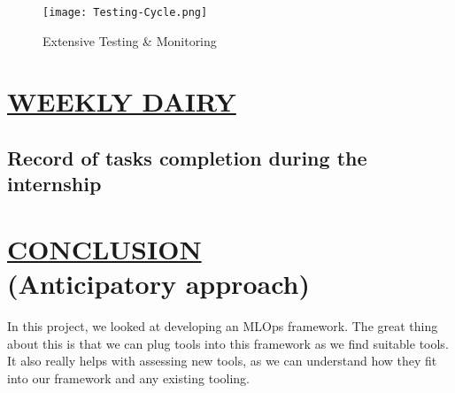 \documentclass[12pt,oneside,a4paper]{report}
\begin{document}
\begin{figure}[h]
\centering
\texttt{[image: Testing-Cycle.png]}
\caption{Extensive Testing \& Monitoring}
\label{fig_TestingCycle}
\end{figure}


\chapter{\underline{WEEKLY DAIRY}}\vspace{-15.0mm}
\section{Record of tasks completion during the internship}
\begin{table}[ht]
\centering
{}
\end{table}

\chapter{\underline{CONCLUSION}\\\large{(Anticipatory approach)}}
In this project, we looked at developing an MLOps framework. The great thing about this is that we can plug tools into this framework as we find suitable tools. It also really helps with assessing new tools, as we can understand how they fit into our framework and any existing tooling. \vspace{5.0mm}
\end{document}
